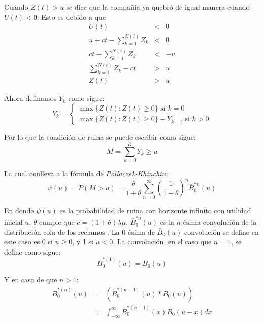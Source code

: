\documentclass[journal]{IEEEtran}
\begin{document}
            Cuando $Z(t) > u$ se dice que la compañía ya quebró de igual manera cuando $U(t)<0$. Esto es debido a que 
            \begin{eqnarray*}
                U(t) &<& 0\\
                u + ct - \sum_{k=1}^{N(t)} {Z_k} &<& 0\\
                ct -\sum_{k=1}^{N(t)} {Z_k} &<& - u\\
                \sum_{k=1}^{N(t)} {Z_k} - ct &>& u\\
                Z(t) &>& u
            \end{eqnarray*}

            Ahora definamos $Y_k$ como sigue:
            \begin{equation}
                Y_k = \begin{cases}
                    \max{\{Z(t): Z(t)\geq0\}} \text{ si } k=0\\
                    \max{\{Z(t) : Z(t)\geq0\}} - Y_{k-1} \text{ si } k>0
                \end{cases}
            \end{equation}

            Por lo que la condición de ruina se puede escribir como sigue:
            \begin{equation}
                M = \sum_{k=0}^K Y_k \geq u
            \end{equation}

            La cual conlleva a la fórmula de \emph{Pollaczek-Khinchin}:
            \begin{equation}
                \psi (u) = P(M>u) = \frac{\theta}{1+\theta} \sum_{n=0}^\infty \left (\frac{1}{1+\theta}\right)^n \bar{B}_0^{*n}(u)
            \end{equation}

            En donde $\psi (u)$ es la probabilidad de ruina con horizonte infinito con utilidad inicial $u$. $\theta$ cumple que $c=(1+\theta)\lambda \mu$. $\bar{B}_0^{*n}(u)$ es la $n$-ésima convolución de la distribución cola de los reclamos \cite{taboga-2021}. La 0-ésima de $\bar{B}_0 (u)$ convolución se define en este caso es 0 si $u \geq 0$, y 1 si $u < 0$. La convolución, en el caso que $n=1$, se define como sigue:
            \begin{equation}
                \bar{B}_0^{*(1)}(u)=\bar{B}_0 (u)
            \end{equation}

            Y en caso de que $n > 1$:
            \begin{eqnarray*}
                \bar{B}_0^{*(n)}(u)&=&(\bar{B}_0^{*(n-1)} (u) * \bar{B}_0 (u))\\
                &=& \int _{-\infty}^{\infty} \bar{B}_0^{*(n-1)} (x) \bar{B}_0 (u-x) dx
            \end{eqnarray*}
    
\end{document}
